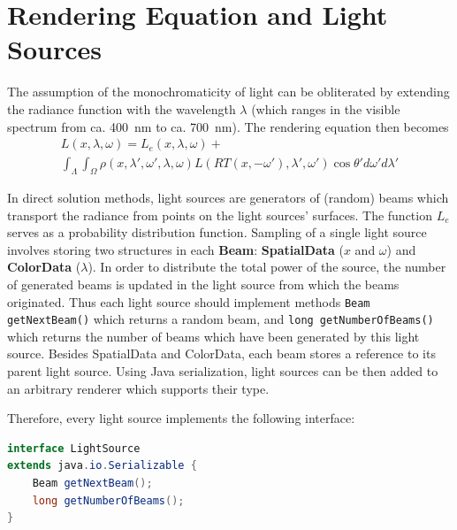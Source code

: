 \documentclass[12pt, letterpaper]{article}
\begin{document}
\section{Rendering Equation and Light Sources}

The assumption of the monochromaticity of light can be obliterated by extending the radiance function with the wavelength $\lambda$ (which ranges in the visible spectrum from ca. 400~nm to ca. 700~nm). The rendering equation then becomes
\begin{gather}
L(x, \lambda, \omega)=L_e(x, \lambda, \omega)+\nonumber\\
\int_{\Lambda}{\int_{\Omega}{\rho(x, \lambda', \omega', \lambda, \omega) L(RT(x, -\omega'), \lambda', \omega') \cos{\theta'} d\omega'} d\lambda'}
\label{eq:rendering_spectral}
\end{gather}

In direct solution methods, light sources are generators of (random) beams which transport the radiance from points on the light sources' surfaces. The function $L_e$ serves as a probability distribution function. Sampling of a single light source involves storing two structures in each \textbf{Beam}: \textbf{SpatialData}  ($x$ and $\omega$) and \textbf{ColorData} ($\lambda$). In order to distribute the total power of the source, the number of generated
beams is updated in the light source from which the beams originated. 
Thus each light source should implement methods \verb|Beam getNextBeam()| which returns a random beam, and \verb|long getNumberOfBeams()| which returns the number of beams which have been generated by this light source. Besides SpatialData and ColorData, each beam stores a reference to its parent light source. Using Java serialization, light sources can be then added to an arbitrary renderer which supports their type.

Therefore, every light source implements the following interface:
\begin{lstlisting}[language=Java]
interface LightSource
extends java.io.Serializable {
	Beam getNextBeam();
	long getNumberOfBeams();
}
\end{lstlisting}
\end{document}

